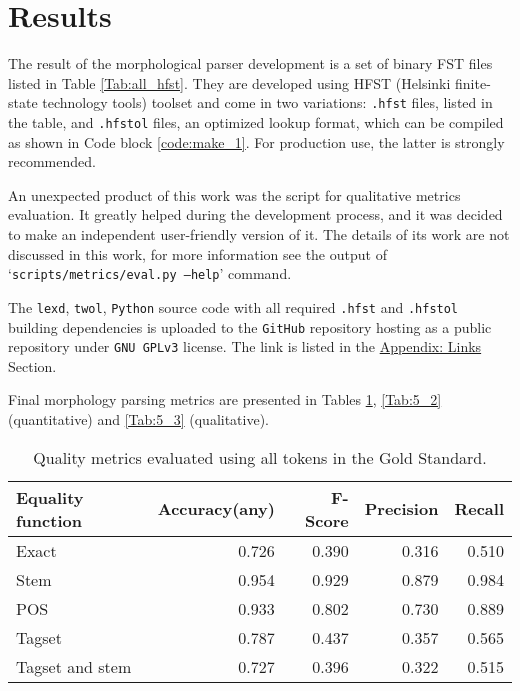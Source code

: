\section{Results}
The result of the morphological parser development is a set of binary FST files listed in Table \ref{Tab:all_hfst}. They are developed using HFST (Helsinki finite-state technology tools) toolset and come in two variations: \texttt{.hfst} files, listed in the table, and \texttt{.hfstol} files, an optimized lookup format, which can be compiled as shown in Code block \ref{code:make_1}. For production use, the latter is strongly recommended. 

An unexpected product of this work was the script for qualitative metrics evaluation. It greatly helped during the development process, and it was decided to make an independent user-friendly version of it. The details of its work are not discussed in this work, for more information see the output of `\texttt{scripts/metrics/eval.py --help}' command.

The \texttt{lexd}, \texttt{twol}, \texttt{Python} source code with all required \texttt{.hfst} and \texttt{.hfstol} building dependencies is uploaded to the \texttt{GitHub} repository hosting as a public repository under \texttt{GNU GPLv3} license. The link is listed in the \hyperref[github_repo]{Appendix: Links} Section.

Final morphology parsing metrics are presented in Tables \ref{Tab:5_1}, \ref{Tab:5_2} (quantitative) and \ref{Tab:5_3} (qualitative).

\begin{table}[!htbp]
    \begin{center}
        \begin{tabular}{|l|r|r|r|r|}
            \hline
            \textbf{Equality function} & \textbf{Accuracy(any)} & \textbf{F-Score} & \textbf{Precision} & 
            \textbf{Recall} \\
            \hline
            \hline
            Exact           & 0.726 & 0.390 & 0.316 & 0.510 \\
            Stem            & 0.954 & 0.929 & 0.879 & 0.984 \\
            POS             & 0.933 & 0.802 & 0.730 & 0.889 \\
            Tagset          & 0.787 & 0.437 & 0.357 & 0.565 \\
            Tagset and stem & 0.727 & 0.396 & 0.322 & 0.515 \\
            \hline
        \end{tabular}
        \caption{Quality metrics evaluated using all tokens in the Gold Standard.}
        \label{Tab:5_1}
    \end{center}
\end{table}

